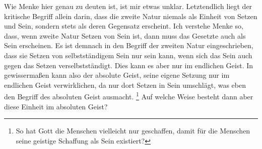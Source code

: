 \documentclass[12pt, a4paper, openany]{report}
\begin{document}
Wie Menke hier genau zu deuten ist, ist mir etwas unklar.
Letztendlich liegt der kritische Begriff allein darin, dass die zweite Natur niemals als Einheit von Setzen und Sein, sondern stets als deren Gegensatz erscheint.
Ich verstehe Menke so, dass, wenn zweite Natur Setzen von Sein ist, dann muss das Gesetzte auch als Sein erscheinen.
Es ist demnach in den Begriff der zweiten Natur eingeschrieben, dass sie Setzen von selbstständigem Sein nur sein kann, wenn sich das Sein auch gegen das Setzen verselbstständigt.
Dies kann es aber nur im endlichen Geist.
In gewissermaßen kann also der absolute Geist, seine eigene Setzung nur im endlichen Geist verwirklichen, da nur dort Setzen in Sein umschlägt, was eben den Begriff des absoluten Geist ausmacht.
\footnote{
    So hat Gott die Menschen vielleicht nur geschaffen, damit für die Menschen seine geistige Schaffung als Sein existiert?
}
Auf welche Weise besteht dann aber diese Einheit im absoluten Geist? 
\end{document}
